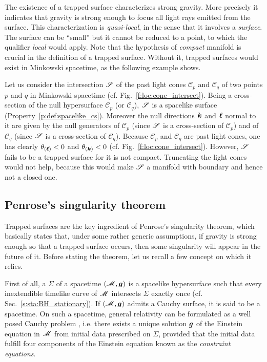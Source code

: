 The existence of a trapped surface characterizes
strong gravity. More precisely it indicates that gravity is strong enough
to focus all light rays emitted from the surface.
This characterization is \emph{quasi-local}, in the sense that it involves a \emph{surface}. The
surface can be ``small'' but it cannot be reduced to a point, to which the qualifier \emph{local}
would apply. Note that the hypothesis of \emph{compact} manifold is crucial in the definition of a
trapped surface. Without it, trapped surfaces would exist in Minkowski
spacetime, as the following example shows.

\begin{example}
Let us consider the intersection $\mathscr{S}$ of the past light cones $\mathscr{C}_p$ and $\mathscr{C}_q$
of two points $p$ and $q$ in Minkowski spacetime (cf. Fig.~\ref{f:loc:cone_intersect}).
Being a cross-section of the null hypersurface $\mathscr{C}_p$ (or $\mathscr{C}_q$),
$\mathscr{S}$ is a spacelike surface (Property~\ref{p:def:spacelike_cs}).
Moreover the null directions $\bm{k}$ and $\bm{\ell}$ normal to it are given by the null generators of
$\mathscr{C}_p$ (since $\mathscr{S}$ is a cross-section of $\mathscr{C}_p$)
and of $\mathscr{C}_q$ (since $\mathscr{S}$ is a cross-section of $\mathscr{C}_q$).
Because $\mathscr{C}_p$ and $\mathscr{C}_q$ are past light cones, one has clearly
$\theta_{(\bm{\ell})} < 0$ and $\theta_{(\bm{k})} < 0$ (cf. Fig.~\ref{f:loc:cone_intersect}).
However, $\mathscr{S}$ fails to be a trapped surface for it is not compact. Truncating the light cones
would not help, because this would make $\mathscr{S}$ a manifold with boundary and hence not a closed one.
\end{example}


\subsection{Penrose's singularity theorem}

Trapped surfaces are the key ingredient of Penrose's singularity theorem,
which basically states that, under some rather generic assumptions, if gravity is
strong enough so that a trapped surface occurs, then some singularity will
appear in the future of it.
Before stating the theorem, let us recall a few concept on which it relies.

First of all, a 
$\Sigma$ of a spacetime $(\mathscr{M},\bm{g})$ is a spacelike
hypersurface such that every inextendible timelike curve of $\mathscr{M}$
intersects $\Sigma$ exactly once (cf. Sec.~\ref{s:sta:BH_stationary}). If $(\mathscr{M},\bm{g})$
admits a Cauchy surface, it is said to be a
 spacetime.
On such a spacetime, general relativity can be formulated as a well posed
Cauchy problem \cite{ChoquG69},
i.e. there exists a unique solution $\bm{g}$ of the Einstein equation
in $\mathscr{M}$ from initial data prescribed on $\Sigma$, provided that the initial data
fulfill four components of the Einstein equation known as the
\emph{constraint equations}.

